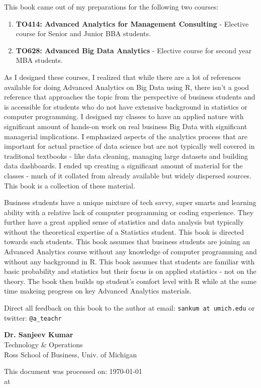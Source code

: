 \documentclass[10pt, letterpaper, twoside]{memoir}\usepackage{knitr}
\newcommand{\chapterendsymbol}{
    \vspace{24pt}
    \Huge
    \hrulefill \hspace{0.1in} \hspace{0.1in} \hrulefill
    \normalsize
    }
\begin{document}
This book came out of my preparations for the following two courses:
\begin{enumerate}
\item \textbf{TO414: Advanced Analytics for Management Consulting} - Elective course for Senior and Junior BBA students. 
\item \textbf{TO628: Advanced Big Data Analytics} - Elective course for second year MBA students.
\end{enumerate}

As I designed these courses, I realized that while there are a lot of references available for doing Advanced Analytics on Big Data using R, there isn't a good reference that approaches the topic from the perspective of business students and is accessible for students who do not have extensive background in statistics or computer programming. I designed my classes to have an applied nature with significant amount of hands-on work on real business Big Data with significant managerial implications. I emphasized aspects of the analytics process that are important for actual practice of data science but are not typically well covered in traditonal textbooks - like data cleaning, managing large datasets and building data dashboards. I ended up creating a significant amount of material for the classes - much of it collated from already available but widely dispersed sources. This book is a collection of these material.

Business students have a unique mixture of tech savvy, super smarts and learning ability with a relative lack of computer programming or coding experience. They further have a great applied sense of statistics and data analysis but typically without the theoretical expertise of a Statistics student. This book is directed towards such students. This book assumes that business students are joining an Advanced Analytics course without any knowledge of computer programming and without any background in R. This book assumes that students are familiar with basic probability and statistics but their focus is on applied statistics - not on the theory. The book then builds up student's comfort level with R while at the same time makeing progress on key Advanced Analytics materials.

Direct all feedback on this book to the author at email: \texttt{sankum at umich.edu} or twitter: \texttt{@a\_teachr}

\vspace{12pt}

\begin{flushright}
\textbf{Dr. Sanjeev Kumar} \\
Technology \& Operations \\
Ross School of Business, Univ. of Michigan

This document was processed on: \today \\ at \printtime
\end{flushright}
\chapterendsymbol
\end{document}
